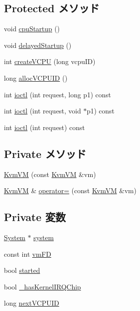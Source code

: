 \subsection*{Protected メソッド}
\begin{DoxyCompactItemize}
\item 
void \hyperlink{classKvmVM_a0161816a71e88927cba137fb4dde7298}{cpuStartup} ()
\item 
void \hyperlink{classKvmVM_a508d2bd176120153c08b1fe4c7e2bc2c}{delayedStartup} ()
\item 
int \hyperlink{classKvmVM_a3841d0c536bfa3b8f3b4e8ef5a46039b}{createVCPU} (long vcpuID)
\item 
long \hyperlink{classKvmVM_a78b0d1b84b25d38fca24a596ebdbcea6}{allocVCPUID} ()
\item 
int \hyperlink{group__KvmIoctl_ga106fe09b5e87d6c14884f8ffff7b338a}{ioctl} (int request, long p1) const 
\item 
int \hyperlink{group__KvmIoctl_ga89db87cb31fe2ba732de8fa68c8bd1f1}{ioctl} (int request, void $\ast$p1) const 
\item 
int \hyperlink{group__KvmIoctl_ga32cd3b0742689c29c9ab9e3e03feb5f2}{ioctl} (int request) const 
\end{DoxyCompactItemize}
\subsection*{Private メソッド}
\begin{DoxyCompactItemize}
\item 
\hyperlink{classKvmVM_a93d7cb38823ea4730a0c04893301c80a}{KvmVM} (const \hyperlink{classKvmVM}{KvmVM} \&vm)
\item 
\hyperlink{classKvmVM}{KvmVM} \& \hyperlink{classKvmVM_a4618bd58dd0f40bb2ab57327f7223310}{operator=} (const \hyperlink{classKvmVM}{KvmVM} \&vm)
\end{DoxyCompactItemize}
\subsection*{Private 変数}
\begin{DoxyCompactItemize}
\item 
\hyperlink{classSystem}{System} $\ast$ \hyperlink{classKvmVM_af27ccd765f13a4b7bd119dc7579e2746}{system}
\item 
const int \hyperlink{classKvmVM_ad268d2f789e668c440ed8fe37f115860}{vmFD}
\item 
bool \hyperlink{classKvmVM_a43c08d193d555a2b2a61c53d2a4e5a63}{started}
\item 
bool \hyperlink{classKvmVM_a7256488cd8c3b1c41c2417ade40cde88}{\_\-hasKernelIRQChip}
\item 
long \hyperlink{classKvmVM_a1739363b740f33ceef9f8187dd2078f1}{nextVCPUID}
\end{DoxyCompactItemize}
